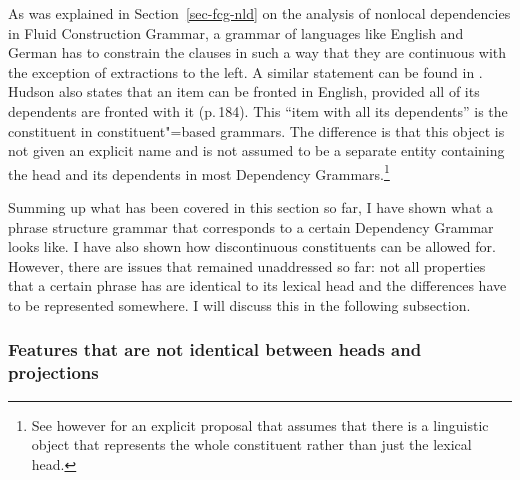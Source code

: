 As was explained in Section~\ref{sec-fcg-nld} on the analysis of nonlocal dependencies in Fluid
Construction Grammar\indexfcg, a grammar of languages like English and German has to constrain the clauses in such a way that they are
continuous with the exception of extractions to the left. A similar statement can be found in
. Hudson also states that an item can be fronted in English,
provided all of its dependents are fronted with it (p.\,184). This ``item with all its dependents'' is the
constituent in constituent"=based grammars. The difference is that this object is not given an
explicit name and is not assumed to be a separate entity containing the head and its dependents in
most Dependency Grammars.\footnote{%
See however \citet{Hellwig2003a} for an explicit proposal that assumes that there is a linguistic
object that represents the whole constituent rather than just the lexical head.
}

Summing up what has been covered in this section so far, I have shown what a phrase structure
grammar that corresponds to a certain Dependency Grammar looks like. I have also shown how discontinuous
constituents can be allowed for. However, there are issues that remained unaddressed so far: not all
properties that a certain phrase has are identical to its lexical head and the differences have to
be represented somewhere. I will discuss this in the following subsection.

\subsubsection{Features that are not identical between heads and projections}
\label{sec-dg-daughters-mothers}
\label{sec-dg-is-simpler}

